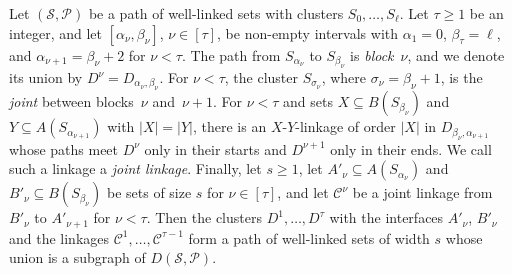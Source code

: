 \documentclass[fontsize=12pt,leading=14pt]{fullpaper}
\newcommand{\Ccal}{\mathcal{C}}
\newcommand{\Pcal}{\mathcal{P}}
\newcommand{\Scal}{\mathcal{S}}
\begin{document}
\begin{observation}\label{obs:s3-blocks}
  Let $(\Scal,\Pcal)$ be a path of well-linked sets with clusters $S_0,\dots,S_\ell$.
  Let $\tau\ge1$ be an integer, and let $[\alpha_\nu,\beta_\nu]$, $\nu\in[\tau]$, be non-empty intervals with $\alpha_1=0$, $\beta_\tau=\ell$, and $\alpha_{\nu+1}=\beta_\nu+2$ for $\nu<\tau$.
  The path from $S_{\alpha_\nu}$ to $S_{\beta_\nu}$ is \emph{block}~$\nu$, and we denote its union by $D^\nu=D_{\alpha_\nu,\beta_\nu}$.
  For $\nu<\tau$, the cluster $S_{\sigma_\nu}$, where $\sigma_\nu=\beta_\nu+1$, is the \emph{joint} between blocks~$\nu$ and~$\nu+1$.
  For $\nu<\tau$ and sets $X\subseteq B(S_{\beta_\nu})$ and $Y\subseteq A(S_{\alpha_{\nu+1}})$ with $|X|=|Y|$, there is an $X$-$Y$-linkage of order $|X|$ in $D_{\beta_\nu,\alpha_{\nu+1}}$ whose paths meet $D^\nu$ only in their starts and $D^{\nu+1}$ only in their ends.
  We call such a linkage a \emph{joint linkage}.
  Finally, let $s\ge1$, let $A'_\nu\subseteq A(S_{\alpha_\nu})$ and $B'_\nu\subseteq B(S_{\beta_\nu})$ be sets of size $s$ for $\nu\in[\tau]$, and let $\Ccal^\nu$ be a joint linkage from $B'_\nu$ to $A'_{\nu+1}$ for $\nu<\tau$.
  Then the clusters $D^1,\dots,D^\tau$ with the interfaces $A'_\nu$, $B'_\nu$ and the linkages $\Ccal^1,\dots,\Ccal^{\tau-1}$ form a path of well-linked sets of width $s$ whose union is a subgraph of $D(\Scal,\Pcal)$.
\end{observation}
\end{document}
